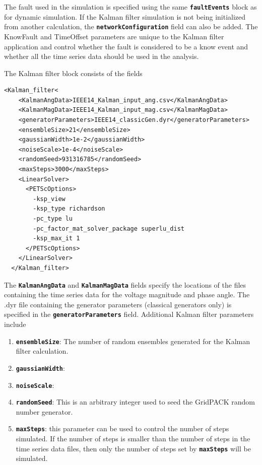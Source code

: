 \documentclass[12pt]{report} %
\begin{document}
The fault used in the simulation is specified using the same \texttt{\textbf{faultEvents}} block as for dynamic simulation. If the Kalman filter simulation is not being initialized from another calculation, the \texttt{\textbf{networkConfiguration}} field can also be added. The KnowFault and TimeOffset parameters are unique to the Kalman filter application and control whether the fault is considered to be a know event and whether all the time series data should be used in the analysis.

The Kalman filter block consists of the fields

{
\color{red}
\begin{Verbatim}[fontseries=b]
  <Kalman_filter<
    <KalmanAngData>IEEE14_Kalman_input_ang.csv</KalmanAngData>
    <KalmanMagData>IEEE14_Kalman_input_mag.csv</KalmanMagData>
    <generatorParameters>IEEE14_classicGen.dyr</generatorParameters>
    <ensembleSize>21</ensembleSize>
    <gaussianWidth>1e-2</gaussianWidth>
    <noiseScale>1e-4</noiseScale>
    <randomSeed>931316785</randomSeed>
    <maxSteps>3000</maxSteps>
    <LinearSolver>
      <PETScOptions>
        -ksp_view
        -ksp_type richardson
        -pc_type lu
        -pc_factor_mat_solver_package superlu_dist
        -ksp_max_it 1
      </PETScOptions>
    </LinearSolver>
  </Kalman_filter>
\end{Verbatim}
}

The \texttt{\textbf{KalmanAngData}} and \texttt{\textbf{KalmanMagData}} fields specify the locations of the files containing the time series data for the voltage magnitude and phase angle. The .dyr file containing the generator parameters (classical generators only) is specified in the \texttt{\textbf{generatorParameters}} field. Additional Kalman filter parameters include

\begin{enumerate}
\item  \texttt{\textbf{ensembleSize}}: The number of random ensembles generated for the Kalman filter calculation.

\item  \texttt{\textbf{gaussianWidth}}: 

\item  \texttt{\textbf{noiseScale}}:

\item  \texttt{\textbf{randomSeed}}: This is an arbitrary integer used to seed the GridPACK random number generator.

\item  \texttt{\textbf{maxSteps}}: this parameter can be used to control the number of steps simulated. If the number of steps is smaller than the number of steps in the time series data files, then only the number of steps set by \texttt{\textbf{maxSteps}} will be simulated.
\end{enumerate}
\end{document}
